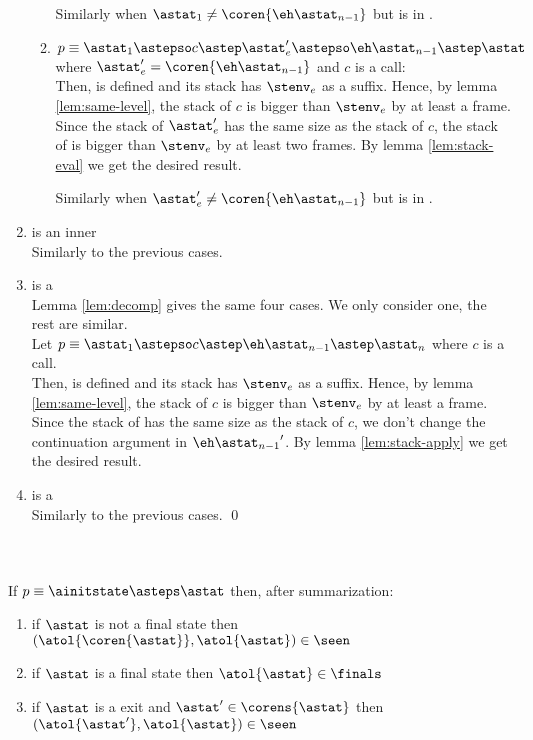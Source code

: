 \documentclass{LMCS}
\theoremstyle{definition} \newtheorem{property}[thm]{Property}
\begin{document}
\begin{enumerate}[(1)]
\begin{enumerate}
    Similarly when $\astat_1 \neq \coren{\astatnmo}$ 
    but is in \corens{\astatnmo}.
  \item
    $p \equiv \astat_1 \astepso c \astep \entry' \astepso \astatnmo 
    \astep \astat$ where $\entry' = \coren{\astatnmo}$ and $c$ is a call: \\
    Then,  is defined and its stack has $\stenv_e$ as a suffix.
    Hence, by lemma \ref{lem:same-level}, the stack of $c$ is bigger than
    $\stenv_e$ by at least a frame.
    Since the stack of $\entry'$ has the same size as the stack of $c$,
    the stack of \astatnmo{} is bigger than $\stenv_e$ by at least two frames.
    By lemma \ref{lem:stack-eval} we get the desired result.

    Similarly when $\entry' \neq \coren{\astatnmo}$ 
    but is in \corens{\astatnmo}.
  \end{enumerate}
\item
  \astatnmo{} is an inner \daceval{} \\
  Similarly to the previous cases.
\item
  \astatnmo{} is a \dauapply{} \\
  Lemma \ref{lem:decomp} gives the same four cases.
  We only consider one, the rest are similar. \\
  Let $p \equiv \astat_1 \astepso c \astep \astatnmo \astep \astat_n$ 
  where $c$ is a call. \\
  Then,  is defined and its stack has $\stenv_e$ as a suffix.
  Hence, by lemma \ref{lem:same-level}, the stack of $c$ is bigger than
  $\stenv_e$ by at least a frame.  
  Since the stack of \astatnmo{} has the same size as the stack of $c$,
  we don't change the continuation argument in $\astatnmo'$.
  By lemma \ref{lem:stack-apply} we get the desired result.
\item
  \astatnmo{} is a \dacapply{} \\
  Similarly to the previous cases.
  \qed
\end{enumerate}
$\phantom{i}$\newline
\begin{thm}[Soundness] ~\\
If $p \equiv \ainitstate \asteps \astat$ then, after summarization:
\begin{enumerate}[$\bullet$]
  \item
    if $\astat$ is not a final state then
    $(\atol{\coren{\astat}}, \atol{\astat}) \in \seen$
  \item
    if $\astat$ is a final state then
    $\atol{\astat} \in \finals$
  \item
    if $\astat$ is a \daceval{} exit and $\astat' \in \corens{\astat}$
    then $(\atol{\astat'}, \atol{\astat}) \in \seen$
\end{enumerate}
\end{thm}
\end{document}
